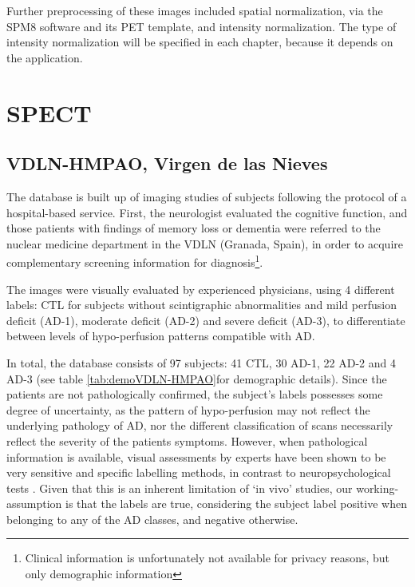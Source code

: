 Further preprocessing of these images included spatial normalization, via the SPM8 software and its \ac{PET} template, and intensity normalization. The type of intensity normalization will be specified in each chapter, because it depends on the application. 

\section{\acs{SPECT}}

\subsection{VDLN-HMPAO, Virgen de las Nieves}\label{sec:vdlnhmpao}
The database is built up of imaging studies of subjects following the protocol of a hospital-based service. First, the neurologist evaluated the cognitive function, and those patients with findings of memory loss or dementia were referred to the nuclear medicine department in the \acf{VDLN} (Granada, Spain), in order to acquire complementary screening information for diagnosis\footnote{Clinical information is unfortunately not available for privacy reasons, but only demographic  information}. 

The images were visually evaluated by experienced physicians, using 4 different labels: \ac{CTL} for subjects without scintigraphic abnormalities and mild perfusion deficit (\ac{AD}-1), moderate deficit (\ac{AD}-2) and severe deficit (\ac{AD}-3), to differentiate between levels of hypo-perfusion patterns compatible with \ac{AD}. 

In total, the database consists of 97 subjects: 41 \ac{CTL}, 30 \ac{AD}-1, 22 \ac{AD}-2 and 4 \ac{AD}-3 (see table \ref{tab:demoVDLN-HMPAO}for demographic details). Since the patients are not pathologically confirmed, the subject's labels possesses some degree of uncertainty, as the pattern of hypo-perfusion may not reflect the underlying pathology of AD, nor the different classification of scans necessarily reflect the severity of the patients symptoms. However, when pathological information is available, visual assessments by experts have been shown to be very sensitive and specific labelling methods, in contrast to neuropsychological tests \cite{jobst_accurate_1998,dougall_systematic_2004}. Given that this is an inherent limitation of `in vivo' studies, our working-assumption is that the labels are true, considering the subject label positive when belonging to any of the \ac{AD} classes, and negative otherwise. 

